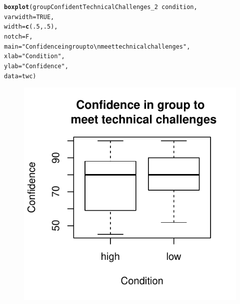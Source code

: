 \documentclass[english]{article}\usepackage[]{graphicx}\usepackage[]{color}
\makeatletter
\def\maxwidth{ %
  \ifdim\Gin@nat@width>\linewidth
    \linewidth
  \else
    \Gin@nat@width
  \fi
}
\newcommand{\hlnum}[1]{\textcolor[rgb]{0.686,0.059,0.569}{#1}}%
\newcommand{\hlstr}[1]{\textcolor[rgb]{0.192,0.494,0.8}{#1}}%
\newcommand{\hlopt}[1]{\textcolor[rgb]{0,0,0}{#1}}%
\newcommand{\hlstd}[1]{\textcolor[rgb]{0.345,0.345,0.345}{#1}}%
\newcommand{\hlkwc}[1]{\textcolor[rgb]{0.333,0.667,0.333}{#1}}%
\newcommand{\hlkwd}[1]{\textcolor[rgb]{0.737,0.353,0.396}{\textbf{#1}}}%
\newenvironment{kframe}{%
 \def\at@end@of@kframe{}%
 \ifinner\ifhmode%
  \def\at@end@of@kframe{\end{minipage}}%
  \begin{minipage}{\columnwidth}%
 \fi\fi%
 \def\FrameCommand##1{\hskip\@totalleftmargin \hskip-\fboxsep
 \colorbox{shadecolor}{##1}\hskip-\fboxsep
     \hskip-\linewidth \hskip-\@totalleftmargin \hskip\columnwidth}%
 \MakeFramed {\advance\hsize-\width
   \@totalleftmargin\z@ \linewidth\hsize
   \@setminipage}}%
 {\par\unskip\endMakeFramed%
 \at@end@of@kframe}
\newenvironment{knitrout}{}{} %
\makeatother
\begin{document}
\begin{knitrout}
\color{fgcolor}\begin{kframe}
\begin{alltt}
\hlkwd{boxplot}\hlstd{(groupConfidentTechnicalChallenges_2} \hlopt{~} \hlstd{condition,}
                                        \hlkwc{varwidth} \hlstd{=} \hlnum{TRUE}\hlstd{,}
                                        \hlkwc{width} \hlstd{=} \hlkwd{c}\hlstd{(}\hlnum{.5}\hlstd{,}\hlnum{.5}\hlstd{),}
                                        \hlkwc{notch} \hlstd{= F,}
                                        \hlkwc{main} \hlstd{=} \hlstr{"Confidence in group to \textbackslash{}n meet technical challenges"}\hlstd{,}
                                        \hlkwc{xlab} \hlstd{=} \hlstr{"Condition"}\hlstd{,}
                                        \hlkwc{ylab} \hlstd{=} \hlstr{"Confidence"}\hlstd{,}
                                        \hlkwc{data} \hlstd{= twc)}
\end{alltt}
\end{kframe}\begin{figure}

{\centering \includegraphics[width=\maxwidth]{figure/groupConfChallengesBoxplot-1} 

}

\end{figure}


\end{knitrout}
\end{document}
